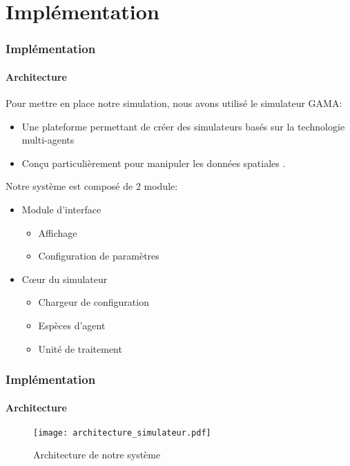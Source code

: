 \section{Implémentation}\label{implementation}
\begin{frame}
    \frametitle{Implémentation}
    \framesubtitle{Architecture}

    Pour mettre en place notre simulation, nous avons utilisé le simulateur GAMA:
    \begin{itemize}
        \item Une plateforme permettant de créer des simulateurs basés sur la technologie multi-agents
        \item Conçu particulièrement pour manipuler les données spatiales .
    \end{itemize}

    Notre système est composé de 2 module:
    \begin{itemize}
        \item Module d'interface
        \begin{itemize}
            \item Affichage
            \item Configuration de paramètres
        \end{itemize}
        \item C\oe ur du simulateur
        \begin{itemize}
            \item Chargeur de configuration
            \item Espèces d'agent
            \item Unité de traitement
        \end{itemize}
    \end{itemize}

\end{frame}


\begin{frame}
    \frametitle{Implémentation}
    \framesubtitle{Architecture}

    \begin{figure}[h]
        \centering
        \texttt{[image: architecture\_simulateur.pdf]}
        \caption{Architecture de notre système}
        \label{fig:architecture-simulateur}
    \end{figure}
\end{frame}

